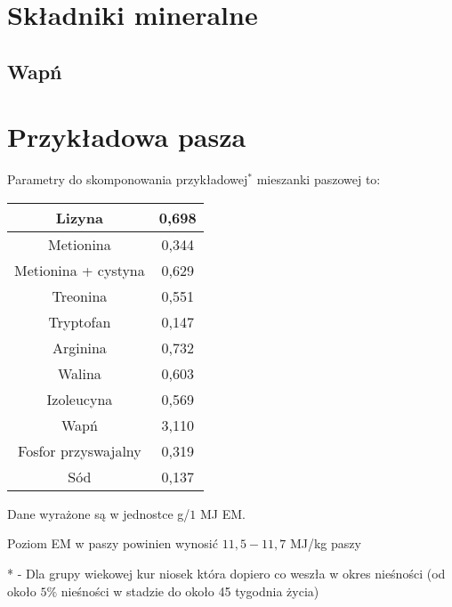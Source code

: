 \documentclass[shortabstract]{iithesis}
\begin{document}
\section{Składniki mineralne}

\subsection{Wapń}


 

\section{Przykładowa pasza}

	Parametry do skomponowania przykładowej$^*$ mieszanki paszowej to:
	
	\begin{tabular}{|c|c|}
		\hline
		Lizyna &0,698 \\
		\hline
		Metionina &0,344 \\
		\hline
		Metionina + cystyna &0,629 \\
		\hline
		Treonina &0,551 \\
		\hline
		Tryptofan &0,147 \\
		\hline
		Arginina &0,732 \\
		\hline
		Walina &0,603 \\
		\hline
		Izoleucyna &0,569 \\
		\hline
		Wapń &3,110 \\
		\hline
		Fosfor przyswajalny &0,319 \\
		\hline
		Sód &0,137 \\
		\hline
	\end{tabular}
	
	Dane wyrażone są w jednostce g/$1$ MJ EM.
	
	Poziom EM w paszy powinien wynosić $11,5-11,7$ MJ/kg paszy
	
	
	* - Dla grupy wiekowej kur niosek która dopiero co weszła w okres nieśności (od około $5\%$ nieśności w stadzie do około 45 tygodnia życia)
	
\end{document}
